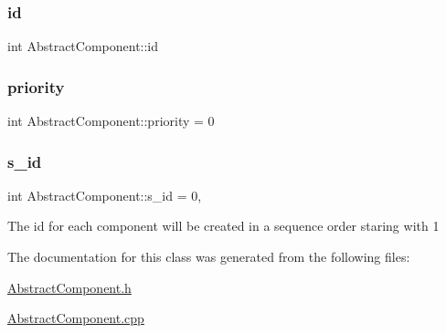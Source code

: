 \subsubsection{\texorpdfstring{id}{id}}
{\footnotesize\ttfamily int Abstract\+Component\+::id\hspace{0.3cm}{\ttfamily [protected]}}

\mbox{\label{class_abstract_component_aff57dfa5f31be093a06b55560e33fb95}} 
\subsubsection{\texorpdfstring{priority}{priority}}
{\footnotesize\ttfamily int Abstract\+Component\+::priority = 0\hspace{0.3cm}{\ttfamily [protected]}}

\mbox{\label{class_abstract_component_a99ce3e5fe7d73dac569b874c15fcaf0d}} 
\subsubsection{\texorpdfstring{s\+\_\+id}{s\_id}}
{\footnotesize\ttfamily int Abstract\+Component\+::s\+\_\+id = 0\hspace{0.3cm}{\ttfamily [static]}, {\ttfamily [protected]}}

The id for each component will be created in a sequence order staring with 1 

The documentation for this class was generated from the following files\+:\begin{DoxyCompactItemize}
\item 
\hyperlink{_abstract_component_8h}{Abstract\+Component.\+h}\item 
\hyperlink{_abstract_component_8cpp}{Abstract\+Component.\+cpp}\end{DoxyCompactItemize}
